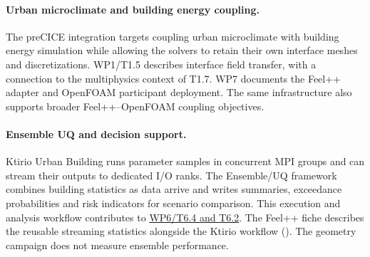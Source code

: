 \paragraph{Urban microclimate and building energy coupling.}
The preCICE integration targets coupling urban microclimate with building
energy simulation while allowing the solvers to retain their own
interface meshes and discretizations. WP1/T1.5 describes interface
field transfer, with a connection to the multiphysics context of T1.7.
WP7 documents the Feel++ adapter and OpenFOAM participant deployment.
The same infrastructure also supports broader Feel++--OpenFOAM coupling
objectives.

\paragraph{Ensemble UQ and decision support.}
Ktirio Urban Building runs parameter samples in concurrent MPI groups and
can stream their outputs to dedicated I/O ranks. The Ensemble/UQ framework
combines building statistics as data arrive and writes summaries,
exceedance probabilities and risk indicators for scenario comparison.
This execution and analysis workflow contributes to
\hyperref[sec:wp6:ensemble-streaming]{WP6/T6.4 and T6.2}.
The Feel++ fiche describes the reusable streaming statistics alongside
the Ktirio workflow ().
The geometry campaign does not measure ensemble performance.
